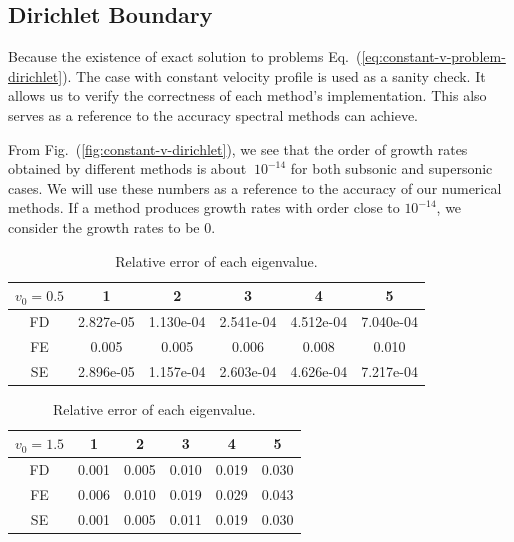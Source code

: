 \subsection{Dirichlet Boundary}
Because the existence of exact solution to problems Eq.~(\ref{eq:constant-v-problem-dirichlet}). The case with constant velocity profile is used as a sanity check. It allows us to verify the correctness of each method's implementation. This also serves as a reference to the accuracy spectral methods can achieve.

From Fig.~(\ref{fig:constant-v-dirichlet}), we see that the order of growth rates obtained by different methods is about $~10^{-14}$ for both subsonic and supersonic cases. We will use these numbers as a reference to the accuracy of our numerical methods. If a method produces growth rates with order close to $10^{-14}$, we consider the growth rates to be 0.

\begin{table} [H]
	\centering
	\caption{Relative error of each eigenvalue.}
	\begin{tabular}{|c|c|c|c|c|c|}
		\hline
		$v_0=0.5$ & 1         & 2         & 3         & 4         & 5         \\
		\hline
		FD        & 2.827e-05 & 1.130e-04 & 2.541e-04 & 4.512e-04 & 7.040e-04 \\
		\hline
		FE        & 0.005     & 0.005     & 0.006     & 0.008     & 0.010     \\
		\hline
		SE        & 2.896e-05 & 1.157e-04 & 2.603e-04 & 4.626e-04 & 7.217e-04 \\
		\hline
	\end{tabular}
	\begin{tabular}{|c|c|c|c|c|c|}
		\hline
		$v_0=1.5$ & 1     & 2     & 3     & 4     & 5     \\
		\hline
		FD        & 0.001 & 0.005 & 0.010 & 0.019 & 0.030 \\
		\hline
		FE        & 0.006 & 0.010 & 0.019 & 0.029 & 0.043 \\
		\hline
		SE        & 0.001 & 0.005 & 0.011 & 0.019 & 0.030 \\
		\hline
	\end{tabular}
	\label{table:eigenvalue-error-dirichlet}
\end{table}


